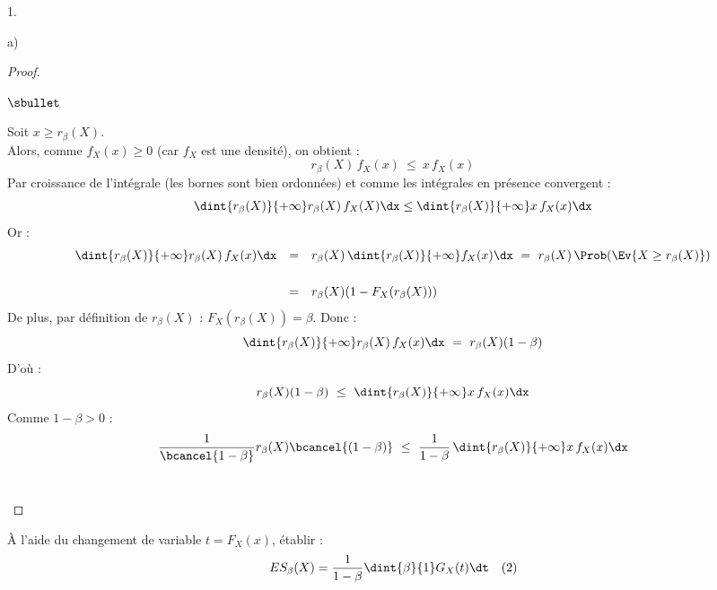 \documentclass[11pt]{article}%
\begin{document}
\begin{noliste}{1.}
\begin{noliste}{a)}
\begin{proof}
\begin{noliste}{$\sbullet$}
	
	\item Soit $x \geq r_\beta(X)$.\\
	Alors, comme $f_X(x) \geq 0$ (car $f_X$ est une densité), on 
	obtient :
	\[
	  r_\beta(X) \, f_X(x) \ \leq \ x \, f_X(x)
	\]
	Par croissance de l'intégrale (les bornes sont bien 
	ordonnées) et comme les intégrales en présence convergent :
	\[
	  \dint{r_\beta(X)}{+\infty} r_\beta(X) \, f_X(X) \dx
	  \leq \dint{r_\beta(X)}{+\infty} x\, f_X(x) \dx
	\]
	Or :
	\[
	\begin{array}{rcl}
	  \dint{r_\beta(X)}{+\infty} r_\beta(X) \, f_X(x) \dx
	  & = & r_\beta(X) \, \dint{r_\beta(X)}{+\infty} f_X(x) \dx
	  \ = \ r_\beta(X) \, \Prob(\Ev{X \geq r_\beta(X)})
	  \\[.6cm]
	  & = & r_\beta(X) (1-F_X(r_\beta(X)))
	\end{array}
	\]
	De plus, par définition de $r_\beta(X)$ : $F_X(r_\beta(X)) 
	=\beta$. Donc :
	\[
	  \dint{r_\beta(X)}{+\infty} r_\beta(X) \, f_X(x) \dx \ = \
	  r_\beta(X)(1-\beta)
	\]
	D'où :
	\[
	  r_\beta(X) (1-\beta) \ \leq \ \dint{r_\beta(X)}{+\infty}
	  x\, f_X(x) \dx
	\]
	Comme $1-\beta>0$ :
	\[
	  \dfrac{1}{\bcancel{1-\beta}} r_\beta(X) \bcancel{(1-\beta)}
	  \ \leq \ \dfrac{1}{1-\beta} \, \dint{r_\beta(X)}{+\infty}
	  x\, f_X(x) \dx
	\]
	~\\[-1.2cm]
      \end{noliste}
    \end{proof}
    
    \item À l'aide du changement de variable $t=F_X(x)$, établir :
    \[
      ES_\beta(X)=\dfrac{1}{1-\beta} \dint{\beta}{1} G_X(t) \dt 
      \quad (2)
    \]
    

\end{noliste}
\end{noliste}
\end{document}
